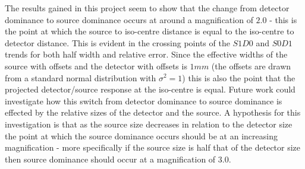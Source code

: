 \documentclass[
  twoside,
  11pt, a4paper,
  footinclude=true,
  headinclude=true,
  cleardoublepage=empty
]{scrbook}
\begin{document}
The results gained in this project seem to show that the change from detector dominance to source dominance occurs at around a magnification of $2.0$ - this is the point at which the source to iso-centre distance is equal to the iso-centre to detector distance. This is evident in the crossing points of the $S1D0$ and $S0D1$ trends for both half width and relative error. Since the effective widths of the source with offsets and the detector with offsets is $1mm$ (the offsets are drawn from a standard normal distribution with $\sigma^2 = 1$) this is also the point that the projected detector/source response at the iso-centre is equal. Future work could investigate how this switch from detector dominance to source dominance is effected by the relative sizes of the detector and the source. A hypothesis for this investigation is that as the source size decreases in relation to the detector size the point at which the source dominance occurs should be at an increasing magnification - more specifically if the source size is half that of the detector size then source dominance should occur at a magnification of $3.0$.

\nocite{Arabi2010,Coban2006,Fessl er2009,Friedman2013,Hilpert2007,hounsfield1973computerized,
        Jaenisch2008,JointCommitteeforGuidesinMetrologyJCGM2008,Kerr2010,Meganck2009,
        Muller2012,Redgrave2008,Takenaga2014,Radon1986,Flack2005,DeChiffre2014,Feldkamp1984
        Fle2014,Kruth2011,Hiller2012}







\end{document}
